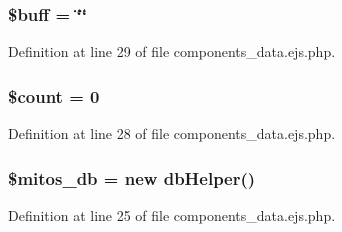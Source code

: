 \hypertarget{components__data_8ejs_8php_aee88b745b9e14ca8b4227da600cea0b8}{
\subsubsection[{\$buff}]{\setlength{\rightskip}{0pt plus 5cm}\$buff = \char`\"{}\char`\"{}}}\label{components__data_8ejs_8php_aee88b745b9e14ca8b4227da600cea0b8}


\-Definition at line 29 of file components\-\_\-data.\-ejs.\-php.

\hypertarget{components__data_8ejs_8php_af789423037bbc89dc7c850e761177570}{
\subsubsection[{\$count}]{\setlength{\rightskip}{0pt plus 5cm}\$count = 0}}\label{components__data_8ejs_8php_af789423037bbc89dc7c850e761177570}


\-Definition at line 28 of file components\-\_\-data.\-ejs.\-php.

\hypertarget{components__data_8ejs_8php_ab5d961f93efe4e2e8d8374f01dd6c65a}{
\subsubsection[{\$mitos\-\_\-db}]{\setlength{\rightskip}{0pt plus 5cm}\$mitos\-\_\-db = new {\bf db\-Helper}()}}\label{components__data_8ejs_8php_ab5d961f93efe4e2e8d8374f01dd6c65a}


\-Definition at line 25 of file components\-\_\-data.\-ejs.\-php.

